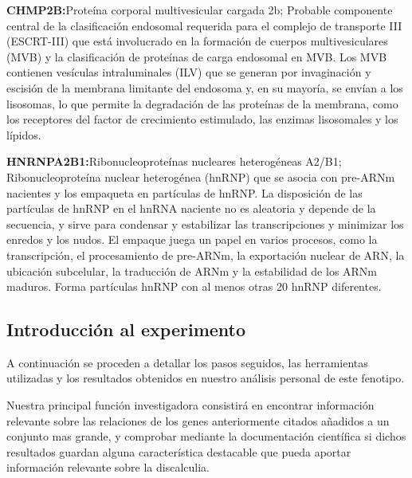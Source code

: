 \hfill

\textbf{CHMP2B\cite{CHMP2B}:}Proteína corporal multivesicular cargada 2b; Probable componente central de la clasificación endosomal requerida para el complejo de transporte III (ESCRT-III) que está involucrado en la formación de cuerpos multivesiculares (MVB) y la clasificación de proteínas de carga endosomal en MVB. Los MVB contienen vesículas intraluminales (ILV) que se generan por invaginación y escisión de la membrana limitante del endosoma y, en su mayoría, se envían a los lisosomas, lo que permite la degradación de las proteínas de la membrana, como los receptores del factor de crecimiento estimulado, las enzimas lisosomales y los lípidos.

\hfill

\textbf{HNRNPA2B1\cite{HNRNPA2B1}:}Ribonucleoproteínas nucleares heterogéneas A2/B1; Ribonucleoproteína nuclear heterogénea (hnRNP) que se asocia con pre-ARNm nacientes y los empaqueta en partículas de hnRNP. La disposición de las partículas de hnRNP en el hnRNA naciente no es aleatoria y depende de la secuencia, y sirve para condensar y estabilizar las transcripciones y minimizar los enredos y los nudos. El empaque juega un papel en varios procesos, como la transcripción, el procesamiento de pre-ARNm, la exportación nuclear de ARN, la ubicación subcelular, la traducción de ARNm y la estabilidad de los ARNm maduros. Forma partículas hnRNP con al menos otras 20 hnRNP diferentes.


\subsection{Introducción al experimento}

A continuación se proceden a detallar los pasos seguidos, las herramientas utilizadas y los resultados obtenidos en nuestro análisis personal de este fenotipo.

\hfill

Nuestra principal función investigadora consistirá en encontrar información relevante sobre las relaciones de los genes anteriormente citados añadidos a un conjunto mas grande, y comprobar mediante la documentación científica si dichos resultados guardan alguna característica destacable que pueda aportar información relevante sobre la discalculia.

\newpage